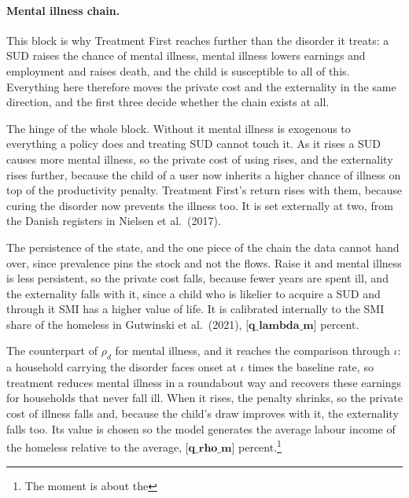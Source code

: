 \documentclass[10pt]{article}
\begin{document}
\paragraph{Mental illness chain.} This block is why Treatment First reaches
further than the disorder it treats: a SUD raises the chance of mental illness,
mental illness lowers earnings and employment and raises death, and the child
is susceptible to all of this. Everything here therefore moves
the private cost and the externality
in the same direction, and the first three decide whether the chain exists
at all.
\begin{description}\setlength{\itemsep}{0.25em}\setlength{\parskip}{0em}
\item[$\iota$, the SUD multiplier on SMI onset.] The hinge of the whole block.
Without it mental illness is exogenous to everything a policy does and
treating SUD cannot touch it. As it rises a SUD causes more mental illness,
so the private cost of using rises, and the externality rises further, because the
child of a user now inherits a higher chance of illness on top of the productivity
penalty. Treatment First's return rises with them, because curing
the disorder now prevents the illness too. It is set externally at two, from the
Danish registers in Nielsen et al.\ (2017).
\item[$\lambda_m$, the annual chance of recovering from SMI.] The persistence of the state,
and the one piece of the chain the data cannot hand over, since prevalence pins the
stock and not the flows. Raise it and mental illness is less persistent,
so the private cost falls, because fewer years are spent ill, and the externality
falls with it, since a child who is likelier to acquire a SUD and
through it SMI has a higher value of life. It is calibrated internally to the SMI
share of the homeless in Gutwinski et al.\ (2021), $\textbf{[q_lambda_m]}$ percent.
\item[$\rho_m$, earnings lost to SMI.] The counterpart of $\rho_d$ for mental
illness, and it reaches the comparison through $\iota$: a household carrying the
disorder faces onset at $\iota$ times the baseline rate, so treatment reduces mental
illness in a roundabout way and recovers these earnings for households that never
fall ill. When it rises, the penalty shrinks, so the private cost of
illness falls and, because the child's draw improves with it, the externality falls
too. Its
value is chosen so the model generates the average labour income of the
homeless relative to the average, $\textbf{[q_rho_m]}$ percent.\textcolor{red}{\footnote{The moment is about the
}}
\end{description}
\end{document}
